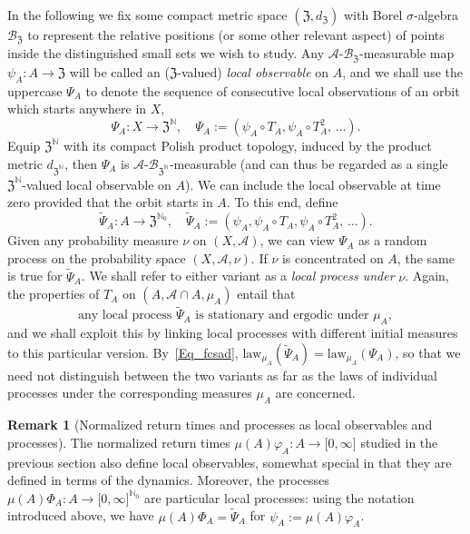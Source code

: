 \documentclass[10pt]{amsart}
\theoremstyle{definition}\newtheorem{defi}[theo]{Definition}\newtheorem{rema}[theo]{Remark}\newtheorem{exam}[theo]{Example}\newtheorem{exem}[theo]{Example}\newtheorem{nota}[theo]{Notation}
\newcommand{\clA}{\mathcal{A}}
\newcommand{\clB}{\mathcal{B}}
\newcommand{\law}{\mathrm{law}}
\newcommand{\frkZ}{\mathfrak{Z}}
\newcommand{\bbN}{\mathbb{N}}
\begin{document}
In the following we fix some compact metric space $(\frkZ,d_{\frkZ})$ with Borel $\sigma$-algebra $\clB_{\frkZ}$ to represent the relative positions (or some other relevant aspect) of points inside the distinguished small sets we wish to study. Any $\clA $-$\clB_{\frkZ}$-measurable map $\psi_{A}:A\rightarrow
\frkZ$ will be called an ($\frkZ$-valued) \emph{local observable} on $A$, and we shall use the uppercase $\Psi_{A}$ to denote the sequence of consecutive local observations of an orbit which starts anywhere in $X$,
\begin{equation}\label{Eq_LocProc}
\Psi_{A}:X\rightarrow\frkZ^{\bbN}, \quad\Psi_{A} :=\left(\psi_{A}\circ T_{A},\psi_{A}\circ T_{A}^{2},\,\ldots\right).
\end{equation}
Equip $\frkZ^{\bbN}$ with its compact Polish product topology, induced by the product metric $d_{\frkZ^{\bbN}}$, then $\Psi_{A}$ is $\clA$-$\clB_{\frkZ^{\bbN}}$-measurable (and can thus be regarded as a single $\frkZ^{\bbN}$-valued local observable on $A$). We can include the local observable at time zero provided that the orbit starts in $A$. To this end, define
\begin{equation}
\widetilde{\Psi}_{A}:A\rightarrow\frkZ^{\bbN_{0}}, \quad \widetilde{\Psi}_{A}:=\left(\psi_{A},\psi_{A}\circ T_{A},\psi_{A}\circ T_{A} ^{2},\,\ldots\right).
\end{equation}
Given any probability measure $\nu$ on $(X,\clA)$, we can view $\Psi_{A}$ as a random process on the probability space $(X,\clA,\nu)$. If $\nu$ is concentrated on $A$, the same is true for $\widetilde{\Psi}_{A}$. We shall refer to either variant as a \emph{local process under }$\nu$. Again, the properties of $T_{A}$ on $(A,\clA\cap A,\mu_{A})$ entail that
\begin{equation} \label{Eq_fcsad}
\text{any local process }\widetilde{\Psi}_{A}\text{ is stationary and ergodic under }\mu_{A},
\end{equation}
and we shall exploit this by linking local processes with different initial measures to this particular version. By~\eqref{Eq_fcsad}, $\law _{\mu_{A}}(\widetilde{\Psi}_{A})=\law_{\mu_{A}}(\Psi_{A})$, so that we need not distinguish between the two variants as far as the laws of individual processes under the corresponding measures $\mu_{A}$ are concerned.

\begin{rema}[{Normalized return times and processes as local observables and processes}]
The normalized return times $\mu(A)\varphi_{A}:A\rightarrow
\lbrack0,\infty]$ studied in the previous section also define local observables, somewhat special in that they are defined in terms of the dynamics. Moreover, the processes $\mu(A)\Phi_{A}:A\rightarrow\lbrack 0,\infty]^{\bbN_{0}}$ are particular local processes: using the notation introduced above, we have $\mu(A)\Phi_{A}=\widetilde{\Psi}_{A}$ for $\psi _{A}:=\mu(A)\varphi_{A}$.
\end{rema}
\end{document}
